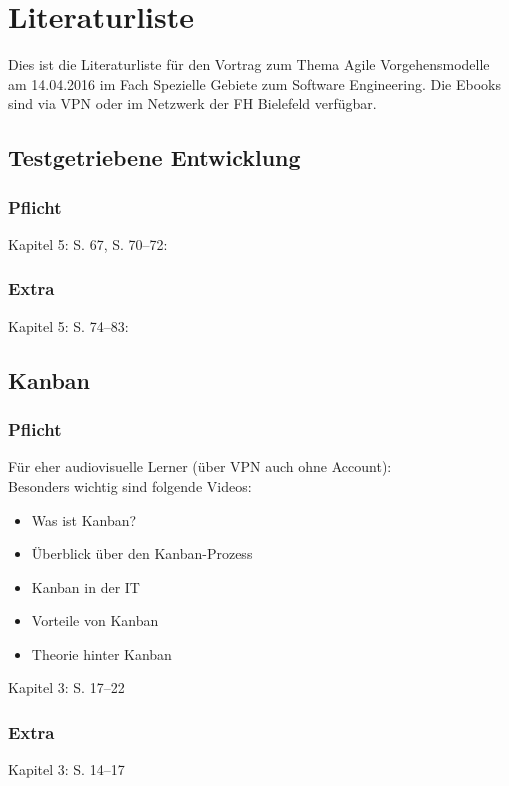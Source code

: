 \documentclass[12pt,a4paper]{report}
\newcommand*{\QuoteM}[1]{\frqq #1\flqq}
\begin{document}
\section*{Literaturliste}
Dies ist die Literaturliste für den Vortrag zum Thema \QuoteM{Agile 
Vorgehensmodelle} am 14.04.2016 im Fach \QuoteM{Spezielle Gebiete zum Software 
Engineering}. Die Ebooks sind via VPN oder im Netzwerk der FH Bielefeld verfügbar.

\subsection*{Testgetriebene Entwicklung}
\subsubsection*{Pflicht}
Kapitel 5: S. 67, S. 70--72: \cite{TestingPython}
\subsubsection*{Extra}
Kapitel 5: S. 74--83: \cite{TestingPython}

\subsection*{Kanban}

\subsubsection*{Pflicht}
Für eher audiovisuelle Lerner (über VPN auch ohne Account): \cite{KanbanV2B}\\
Besonders wichtig sind folgende Videos:

\begin{itemize}
	\item \QuoteM{Was ist Kanban?}
	\item \QuoteM{Überblick über den Kanban-Prozess}
	\item \QuoteM{Kanban in der IT}
	\item \QuoteM{Vorteile von Kanban}
	\item \QuoteM{Theorie hinter Kanban}
\end{itemize}

Kapitel 3: S. 17--22 \cite{KanbaninderIT}
\subsubsection*{Extra}
Kapitel 3: S. 14--17 \cite{KanbaninderIT}
\end{document}
